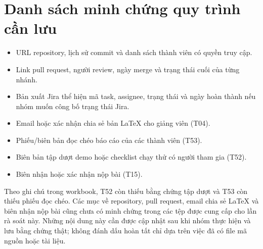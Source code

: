 \clearpage
\section*{Danh sách minh chứng quy trình cần lưu}
\begin{itemize}
  \item URL repository, lịch sử commit và danh sách thành viên có quyền truy cập.
  \item Link pull request, người review, ngày merge và trạng thái cuối của từng nhánh.
  \item Bản xuất Jira thể hiện mã task, assignee, trạng thái và ngày hoàn thành nếu nhóm muốn công bố trạng thái Jira.
  \item Email hoặc xác nhận chia sẻ bản LaTeX cho giảng viên (T04).
  \item Phiếu/biên bản đọc chéo báo cáo của các thành viên (T53).
  \item Biên bản tập dượt demo hoặc checklist chạy thử có người tham gia (T52).
  \item Biên nhận hoặc xác nhận nộp bài (T15).
\end{itemize}

Theo ghi chú trong workbook, T52 còn thiếu bằng chứng tập dượt và T53 còn thiếu phiếu đọc chéo. Các mục về repository, pull request, email chia sẻ LaTeX và biên nhận nộp bài cũng chưa có minh chứng trong các tệp được cung cấp cho lần rà soát này. Những nội dung này cần được cập nhật sau khi nhóm thực hiện và lưu bằng chứng thật; không đánh dấu hoàn tất chỉ dựa trên việc đã có file mã nguồn hoặc tài liệu.
